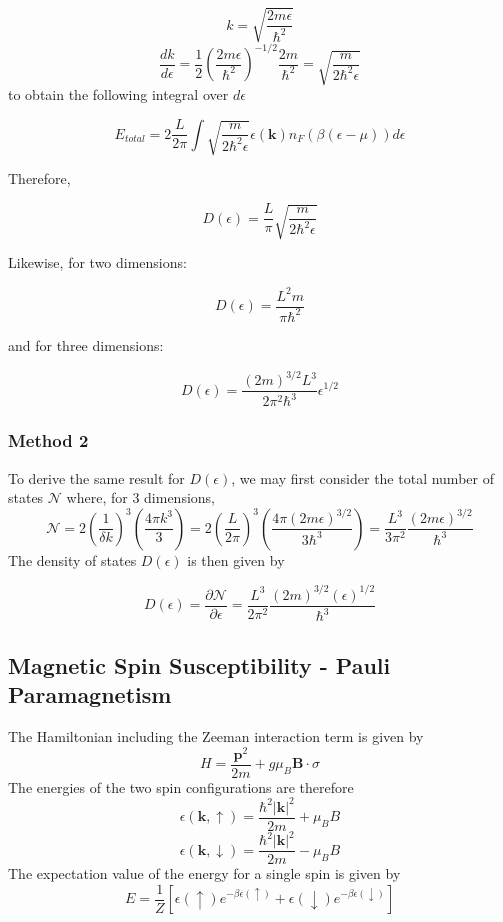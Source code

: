 \documentclass[10pt]{article}
\begin{document}
$$
k = \sqrt{\frac{2m\epsilon}{\hbar^{2}}}
$$
$$
\frac{dk}{d\epsilon} = \frac{1}{2}\left ( \frac{2m\epsilon}{\hbar^{2}}\right )^{-1/2} \frac{2m}{\hbar^{2}} = \sqrt{\frac{m}{2\hbar^{2}\epsilon}}
$$
to obtain the following integral over $d\epsilon$

$$E_{total} = 2\frac{L}{2\pi}\int \sqrt{\frac{m}{2\hbar^{2}\epsilon}}\epsilon(\textbf{k}) n_{F}(\beta(\epsilon - \mu))  d\epsilon $$

Therefore,

$$D(\epsilon) = \frac{L}{\pi} \sqrt{\frac{m}{2\hbar^{2}\epsilon}}$$

Likewise, for two dimensions:

$$D(\epsilon) = \frac{L^{2}m}{\pi \hbar^{2}}$$

and for three dimensions:

$$D(\epsilon) = \frac{(2m)^{3/2}L^{3}}{2\pi^{2}\hbar^{3}}\epsilon^{1/2}$$

\subsubsection{Method 2}
To derive the same result for $D(\epsilon)$, we may first consider the total number of states $\mathcal{N}$ where, for $3$ dimensions,
$$\mathcal{N} = 2 \left (\frac{1}{\delta k}\right)^{3}\left (\frac{4\pi k^{3}}{3}\right ) = 2 \left ( \frac{L}{2\pi} \right)^{3} \left (\frac{4\pi (2m\epsilon)^{3/2}}{3\hbar^{3}} \right ) = \frac{L^{3}}{3\pi^{2}}\frac{(2m\epsilon)^{3/2}}{\hbar^{3}}$$
The density of states $D(\epsilon)$ is then given by

$$
D(\epsilon) = \frac{\partial \mathcal{N}}{\partial \epsilon} = \frac{L^{3}}{2\pi^{2}}\frac{(2m)^{3/2}(\epsilon)^{1/2}}{\hbar^{3}}
$$

\subsection{Magnetic Spin Susceptibility - Pauli Paramagnetism}
The Hamiltonian including the Zeeman interaction term is given by
$$
H = \frac{\textbf{p}^{2}}{2m} + g\mu_{B}\textbf{B}\cdot\sigma
$$
The energies of the two spin configurations are therefore
$$
\epsilon(\textbf{k}, \uparrow) = \frac{\hbar^{2}|\textbf{k}|^{2}}{2m} + \mu_{B}B
$$
$$
\epsilon(\textbf{k}, \downarrow) = \frac{\hbar^{2}|\textbf{k}|^{2}}{2m} - \mu_{B}B
$$
The expectation value of the energy for a single spin is given by
$$E = \frac{1}{Z}\left [ \epsilon(\uparrow)e^{-\beta \epsilon(\uparrow)} + \epsilon(\downarrow)e^{-\beta \epsilon(\downarrow)}\right ]$$
\end{document}
